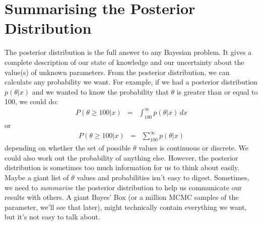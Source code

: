 \chapter{Summarising the Posterior Distribution}
The posterior distribution is the full answer to any Bayesian problem. It gives
a complete description of our state of knowledge and our uncertainty about the
value(s) of unknown
parameters. From the posterior distribution, we can calculate any probability
we want. For example, if we had a posterior distribution $p(\theta|x)$ and we
wanted to know the probability that $\theta$ is greater than or equal to 100, we could do:
\begin{eqnarray}
P(\theta \geq 100 | x) &=& \int_{100}^\infty p(\theta | x) \, dx
\end{eqnarray}
or
\begin{eqnarray}
P(\theta \geq 100 | x) &=& \sum_{100}^\infty p(\theta | x)
\end{eqnarray}
depending on whether the set of possible $\theta$ values is continuous or
discrete. We could also work out the probability of anything else.
However, the posterior distribution is sometimes too much
information for us to think about easily. Maybe a giant list of $\theta$
values and probabilities isn't easy to digest. Sometimes,
we need to {\it summarise} the posterior distribution to help us
communicate our results with others. A giant Bayes' Box (or a million MCMC
samples of the parameter, we'll see that later), might technically
contain everything we want, but it's not easy to talk about.

